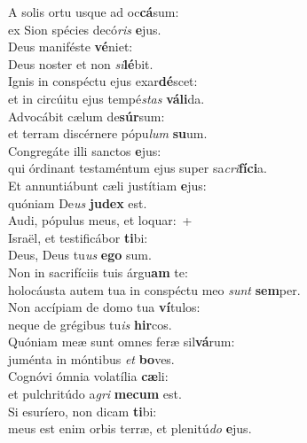 \evenverse A solis ortu usque ad oc\textbf{cá}sum:~\*\\
\evenverse ex Sion spécies decó\textit{ris} \textbf{e}jus.\\
\oddverse Deus maniféste \textbf{vé}niet:~\*\\
\oddverse Deus noster et non \textit{si}\textbf{lé}bit.\\
\evenverse Ignis in conspéctu ejus exar\textbf{dé}scet:~\*\\
\evenverse et in circúitu ejus tempé\textit{stas} \textbf{vá}\textbf{li}da.\\
\oddverse Advocábit cælum de\textbf{súr}sum:~\*\\
\oddverse et terram discérnere pópu\textit{lum} \textbf{su}um.\\
\evenverse Congregáte illi sanctos \textbf{e}jus:~\*\\
\evenverse qui órdinant testaméntum ejus super sa\textit{cri}\textbf{fí}\textbf{ci}a.\\
\oddverse Et annuntiábunt cæli justítiam \textbf{e}jus:~\*\\
\oddverse quóniam De\textit{us} \textbf{ju}\textbf{dex} est.\\
\evenverse Audi, pópulus meus, et loquar:~+\\
\evenverse  Israël, et testificábor \textbf{ti}bi:~\*\\
\evenverse Deus, Deus tu\textit{us} \textbf{e}\textbf{go} sum.\\
\oddverse Non in sacrifíciis tuis árgu\textbf{am} te:~\*\\
\oddverse holocáusta autem tua in conspéctu meo \textit{sunt} \textbf{sem}per.\\
\evenverse Non accípiam de domo tua \textbf{ví}tulos:~\*\\
\evenverse neque de grégibus tu\textit{is} \textbf{hir}cos.\\
\oddverse Quóniam meæ sunt omnes feræ sil\textbf{vá}rum:~\*\\
\oddverse juménta in móntibus \textit{et} \textbf{bo}ves.\\
\evenverse Cognóvi ómnia volatília \textbf{cæ}li:~\*\\
\evenverse et pulchritúdo a\textit{gri} \textbf{me}\textbf{cum} est.\\
\oddverse Si esuríero, non dicam \textbf{ti}bi:~\*\\
\oddverse meus est enim orbis terræ, et plenitú\textit{do} \textbf{e}jus.\\
